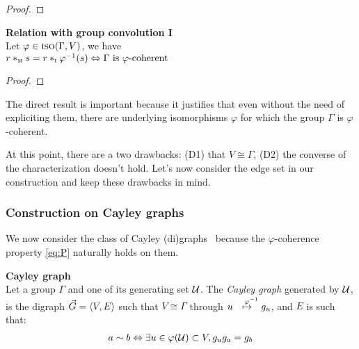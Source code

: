 \begin{proof}
\todo{}
\end{proof}

\begin{proposition}\textbf{Relation with group convolution I}\\
Let $\varphi \in \iso(\Gamma, V)$, we have\\
$r \ast_{\M} s = r \ast_{\I} \varphi^{-1}(s) \Leftrightarrow \Gamma \text{ is } \varphi \text{-coherent}$
\end{proposition}

\begin{proof}
\todo{}
\end{proof}

The direct result is important because it justifies that even without the need of expliciting them, there are underlying isomorphisms $\varphi$ for which the group $\Gamma$ is $\varphi$-coherent.


At this point, there are a two drawbacks: (D1) that $V \cong \Gamma$, (D2) the converse of the characterization doesn't hold. Let's now consider the edge set in our construction and keep these drawbacks in mind.

\subsubsection{Construction on Cayley graphs}

We now consider the class of Cayley (di)graphs~\citep{cayley1878desiderata,wiki:cayley} because the $\varphi$-coherence property \eqref{eq:P} naturally holds on them.


\begin{definition}\textbf{Cayley graph}\\
Let a group $\Gamma$ and one of its generating set $\cu$. The \emph{Cayley graph} generated by $\cu$, is the digraph $\vgve$ such that $V \cong \Gamma$ through $u \overset{\h{9}\varphi^{-1}}{\mapsto} g_u$, and $E$ is such that:
\begin{gather*}
a \sim b \Leftrightarrow \exists u \in \varphi(\cu) \subset V, g_ug_a = g_b
\end{gather*}
\end{definition}

